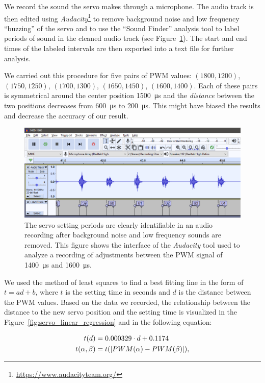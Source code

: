 We record the sound the servo makes through a microphone. The audio track is then edited using \textit{Audacity}\footnote{\url{https://www.audacityteam.org/}} to remove background noise and low frequency ``buzzing'' of the servo and to use the ``Sound Finder'' analysis tool to label periods of sound in the cleaned audio track (see Figure~\ref{fig:audacity}). The start and end times of the labeled intervals are then exported into a text file for further analysis.

We carried out this procedure for five pairs of \gls*{PWM} values: $(1800, 1200)$, $(1750, 1250)$, $(1700, 1300)$, $(1650, 1450)$, $(1600, 1400)$. Each of these pairs is symmetrical around the center position \SI{1500}{\micro\second} and the \textit{distance} between the two positions decreases from \SI{600}{\micro\second} to \SI{200}{\micro\second}. This might have biased the results and decrease the accuracy of our result.

\begin{figure}[b]
	\includegraphics[width=\textwidth]{../img/servo_experiment_audacity}
	\protect\caption{The servo setting periods are clearly identifiable in an audio recording after background noise and low frequency sounds are removed. This figure shows the interface of the \textit{Audacity} tool used to analyze a recording of adjustments between the PWM signal of \SI{1400}{\micro\second} and \SI{1600}{\micro\second}.}
	\label{fig:audacity}
\end{figure}

We used the method of least squares to find a best fitting line in the form of $t=ad+b$, where $t$ is the setting time in seconds and $d$ is the distance between the \gls*{PWM} values. Based on the data we recorded, the relationship between the distance to the new servo position and the setting time is visualized in the Figure~\ref{fig:servo_linear_regression} and in the following equation:

\begin{equation}
\label{eq:servo_setting_time}
\begin{aligned}
t(d)&=0.000329\cdot d + 0.1174\\
t(\alpha,\beta)&=t(\left|{PWM(\alpha)-PWM(\beta)}\right|),
\end{aligned}
\end{equation}

